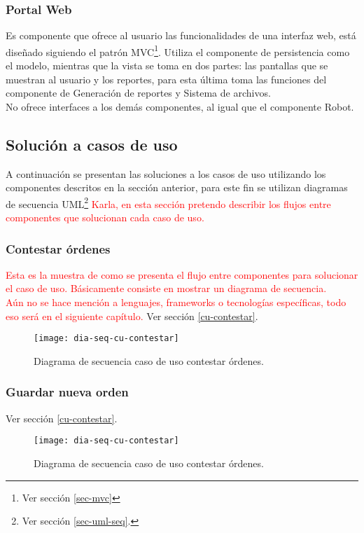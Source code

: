 \subsubsection{Portal Web}
Es componente que ofrece al usuario las funcionalidades de una interfaz web, está diseñado siguiendo el patrón MVC\footnote{Ver sección \ref{sec-mvc}}. Utiliza el componente de persistencia como el modelo, mientras que la vista se toma en dos partes: las pantallas que se muestran al usuario y los reportes, para esta última toma las funciones del componente de Generación de reportes y Sistema de archivos.\\
No ofrece interfaces a los demás componentes, al igual que el componente Robot.

\subsection{Solución a casos de uso}
A continuación se presentan las soluciones a los casos de uso utilizando los componentes descritos en la sección anterior, para este fin se utilizan diagramas de secuencia UML\footnote{Ver sección \ref{sec-uml-seq}.}
\textcolor{red}{Karla, en esta sección pretendo describir los flujos entre componentes que solucionan cada caso de uso.}

\subsubsection{Contestar órdenes}
\textcolor{red}{
	Esta es la muestra de como se presenta el flujo entre componentes para solucionar el caso de uso. Básicamente consiste en mostrar un diagrama de secuencia.\\
	Aún no se hace mención a lenguajes, frameworks o tecnologías específicas, todo eso será en el siguiente capítulo.
}
Ver sección \ref{cu-contestar}.\\
\begin{figure}[h]
	\centering
	\texttt{[image: dia-seq-cu-contestar]}
	\caption{Diagrama de secuencia caso de uso contestar órdenes.}
	\label{fig:dia-seq-cu-contestar}
\end{figure}
\iffalse
\subsubsection{Guardar nueva orden}
Ver sección \ref{cu-contestar}.\\
\begin{figure}[h]
	\centering
	\texttt{[image: dia-seq-cu-contestar]}
	\caption{Diagrama de secuencia caso de uso contestar órdenes.}
	\label{fig:dia-seq-cu-contestar}
\end{figure}
